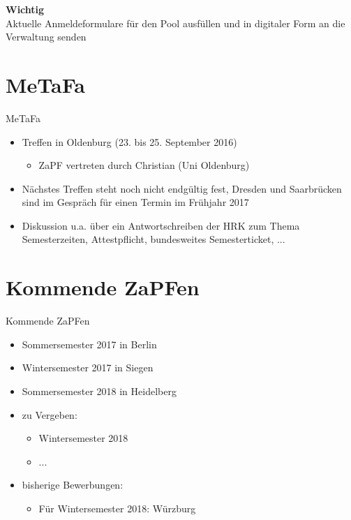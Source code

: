 \documentclass[compress, aspectratio=169]{beamer}
\begin{document}
\begin{frame}
	\begin{framed}
		\begin{center}
			{\Huge \textbf{Wichtig}}\\
			\vspace{0.5cm}
			{\Large Aktuelle Anmeldeformulare für den Pool ausfüllen und in digitaler Form an die Verwaltung senden}
		\end{center}
	\end{framed}
\end{frame}

\section{MeTaFa}

\begin{frame}{MeTaFa}
	\begin{itemize}
		\item Treffen in Oldenburg (23. bis 25. September 2016)
			\begin{itemize}
				\item ZaPF vertreten durch Christian (Uni Oldenburg)
			\end{itemize}
		\item Nächstes Treffen steht noch nicht endgültig fest, Dresden und Saarbrücken sind im Gespräch für einen Termin im Frühjahr 2017
		\item Diskussion u.a. über ein Antwortschreiben der HRK zum Thema Semesterzeiten, Attestpflicht, bundesweites Semesterticket, ...
	\end{itemize}
\end{frame}

\section{Kommende ZaPFen}
\begin{frame}{Kommende ZaPFen}
	\begin{itemize}
		\item Sommersemester 2017 in Berlin
		\item Wintersemester 2017 in Siegen
		\item Sommersemester 2018 in Heidelberg
		\item zu Vergeben:
			\begin{itemize}
				\item Wintersemester 2018
				\item ...
			\end{itemize}
		\item bisherige Bewerbungen:
			\begin{itemize}
				\item Für Wintersemester 2018: Würzburg
			\end{itemize}
	\end{itemize}
\end{frame}
\end{document}
